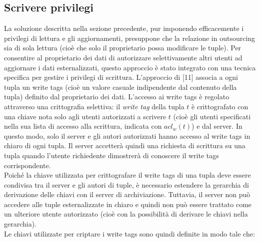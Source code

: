 \subsection{Scrivere privilegi}
La soluzione descritta nella sezione precedente, pur imponendo efficacemente i privilegi di lettura e gli aggiornamenti, presuppone che la relazione in outsourcing sia di sola lettura (cioè che solo il proprietario possa modificare le tuple). Per consentire al proprietario dei dati di autorizzare selettivamente altri utenti ad aggiornare i dati esternalizzati, questo approccio è stato integrato con una tecnica specifica per gestire i privilegi di scrittura. L'approccio di [11] associa a ogni tupla un write tags (cioè un valore casuale indipendente dal contenuto della tupla) definito dal proprietario dei dati. L'accesso ai write tags è regolato attraverso una crittografia selettiva: il \textit{write tag} della tupla $t$ è crittografato con una chiave nota solo agli utenti autorizzati a scrivere $t$ (cioè gli utenti specificati nella sua lista di accesso alla scrittura, indicata con $acl_w(t)$) e dal server. In questo modo, solo il server e gli autori autorizzati hanno accesso al write tags in chiaro di ogni tupla. Il server accetterà quindi una richiesta di scrittura su una tupla quando l'utente richiedente dimostrerà di conoscere il write tags corrispondente.\\
\newline
Poiché la chiave utilizzata per crittografare il write tags di una tupla deve essere condivisa tra il server e gli autori di tuple, è necessario estendere la gerarchia di derivazione delle chiavi con il server di archiviazione. Tuttavia, il server non può accedere alle tuple esternalizzate in chiaro e quindi non può essere trattato come un ulteriore utente autorizzato (cioè con la possibilità di derivare le chiavi nella gerarchia). \\Le chiavi utilizzate per criptare i write tags sono quindi definite in modo tale che: 

